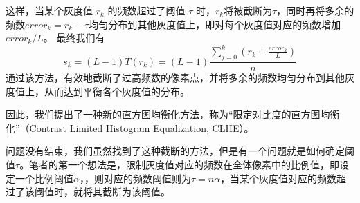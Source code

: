 \documentclass{ctexart}
\begin{document}
这样，当某个灰度值 $r_k$ 的频数超过了阈值 $\tau$ 时，$r_k$将被截断为$\tau$，同时再将多余的频数$error_k=r_k-\tau$均匀分布到其他灰度值上，即对每个灰度值对应的频数增加$error_k/L$。
最终我们有
\begin{equation}
s_k = (L-1)T(r_k)=(L-1)\frac{\sum_{j=0}^{k}(r_k+\frac{error_k}{L})}{n}
\end{equation}
通过该方法，有效地截断了过高频数的像素点，并将多余的频数均匀分布到其他灰度值上，从而达到平衡各个灰度值的分布。

因此，我们提出了一种新的直方图均衡化方法，称为“限定对比度的直方图均衡化”（Contrast Limited Histogram Equalization, CLHE）。

问题没有结束，我们虽然找到了这种截断的方法，但是有一个问题就是如何确定阈值$\tau$。笔者的第一个想法是，限制灰度值对应的频数在全体像素中的比例值，即设定一个比例阈值$\alpha$，，则对应的频数阈值则为$\tau=n\alpha$，当某个灰度值对应的频数超过了该阈值时，就将其截断为该阈值。
\end{document}
